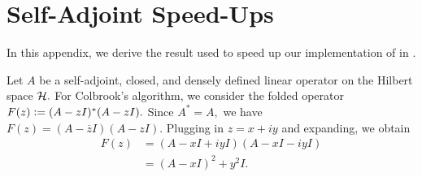 \chapter{Self-Adjoint Speed-Ups}\label{speedup}


In this appendix, we derive the result used to speed up our implementation of  in .

Let $A$ be a self-adjoint, closed, and densely defined linear operator on the Hilbert space $\mathcal{H}.$  For Colbrook's algorithm, we consider the folded operator $F(z) \vcentcolon= (A-zI)^*(A-zI).$ Since $A^*=A,$ we have
$F(z) = (A-\overline{z}I)(A-zI).$
Plugging in $z = x +iy$ and expanding, we obtain
\begin{align}
    F(z) &= (A-xI + iyI)(A-xI-iyI)\\
    &=(A-xI)^2 + y^2 I.
\end{align}



